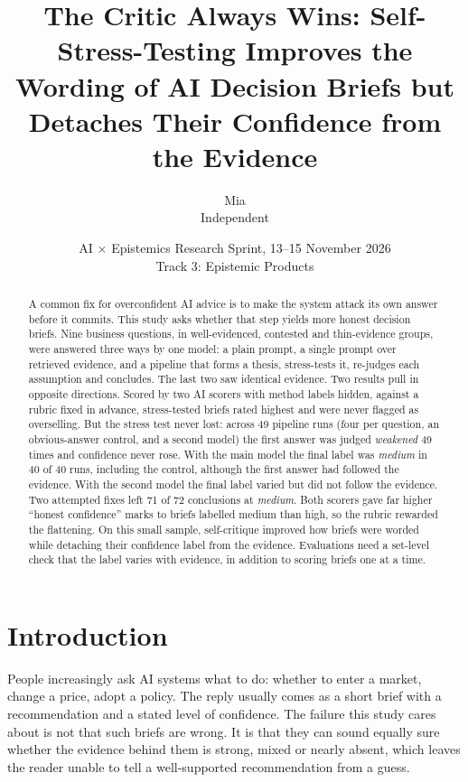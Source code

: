 \documentclass[11pt]{article}
\title{\textbf{The Critic Always Wins: Self-Stress-Testing Improves the Wording of AI Decision Briefs but Detaches Their Confidence from the Evidence}}
\author{Mia\\ \small Independent}
\date{\small AI $\times$ Epistemics Research Sprint, 13--15 November 2026\\ Track 3: Epistemic Products}
\begin{document}
\maketitle
\vspace{-1.2em}

\begin{abstract}
\noindent
A common fix for overconfident AI advice is to make the system attack its own answer before it commits. This study asks whether that step yields more honest decision briefs. Nine business questions, in well-evidenced, contested and thin-evidence groups, were answered three ways by one model: a plain prompt, a single prompt over retrieved evidence, and a pipeline that forms a thesis, stress-tests it, re-judges each assumption and concludes. The last two saw identical evidence. Two results pull in opposite directions. Scored by two AI scorers with method labels hidden, against a rubric fixed in advance, stress-tested briefs rated highest and were never flagged as overselling. But the stress test never lost: across 49 pipeline runs (four per question, an obvious-answer control, and a second model) the first answer was judged \emph{weakened} 49 times and confidence never rose. With the main model the final label was \emph{medium} in 40 of 40 runs, including the control, although the first answer had followed the evidence. With the second model the final label varied but did not follow the evidence. Two attempted fixes left 71 of 72 conclusions at \emph{medium}. Both scorers gave far higher ``honest confidence'' marks to briefs labelled medium than high, so the rubric rewarded the flattening. On this small sample, self-critique improved how briefs were worded while detaching their confidence label from the evidence. Evaluations need a set-level check that the label varies with evidence, in addition to scoring briefs one at a time.
\end{abstract}

\section{Introduction}

People increasingly ask AI systems what to do: whether to enter a market, change a price, adopt a policy. The reply usually comes as a short brief with a recommendation and a stated level of confidence. The failure this study cares about is not that such briefs are wrong. It is that they can sound equally sure whether the evidence behind them is strong, mixed or nearly absent, which leaves the reader unable to tell a well-supported recommendation from a guess.
\end{document}
